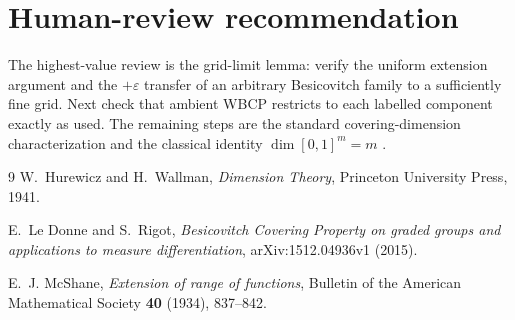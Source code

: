 \documentclass[11pt]{article}
\begin{document}
\section{Human-review recommendation}

The highest-value review is the grid-limit lemma: verify the uniform extension
argument and the $+\varepsilon$ transfer of an arbitrary Besicovitch family to
a sufficiently fine grid.  Next check that ambient WBCP restricts to each
labelled component exactly as used.  The remaining steps are the standard
covering-dimension characterization and the classical identity
$\dim[0,1]^m=m$ \cite{HurewiczWallman}.

\begin{thebibliography}{9}
W.~Hurewicz and H.~Wallman,
\emph{Dimension Theory}, Princeton University Press, 1941.

E.~Le Donne and S.~Rigot,
\emph{Besicovitch Covering Property on graded groups and applications to
measure differentiation}, arXiv:1512.04936v1 (2015).

E.~J. McShane,
\emph{Extension of range of functions},
Bulletin of the American Mathematical Society \textbf{40} (1934), 837--842.
\end{thebibliography}
\end{document}
